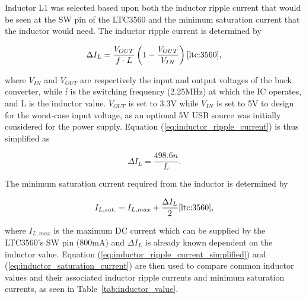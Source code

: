 Inductor L1 was selected based upon both the inductor ripple current that would be seen at the SW pin of the LTC3560 and the minimum saturation current that the inductor would need. The inductor ripple current is determined by

\begin{equation}
\label{eq:inductor_ripple_current}
    {\Delta}I_{L} = \frac{V_{OUT}}{f\cdot L}\left(1-\frac{V_{OUT}}{V_{IN}}\right) \cite{ltc:3560},
\end{equation}

where $V_{IN}$ and $V_{OUT}$ are respectively the input and output voltages of the buck converter, while f is the switching frequency (2.25MHz) at which the IC operates, and L is the inductor value. $V_{OUT}$ is set to 3.3V while $V_{IN}$ is set to 5V to design for the worst-case input voltage, as an optional 5V USB source was initially considered for the power supply. Equation (\ref{eq:inductor_ripple_current}) is thus simplified as

\begin{equation}
\label{eq:inductor_ripple_current_simplified}
    {\Delta}I_{L} = \frac{498.6n}{L}.
\end{equation}

The minimum saturation current required from the inductor is determined by

\begin{equation}
\label{eq:inductor_saturation_current}
    I_{L,sat.} = I_{L,max} + \frac{{\Delta}I_{L}}{2} \cite{ltc:3560},
\end{equation}

where $I_{L,max}$ is the maximum DC current which can be supplied by the LTC3560's SW pin (800mA) and ${\Delta}I_{L}$ is already known dependent on the inductor value. Equation (\ref{eq:inductor_ripple_current_simplified}) and (\ref{eq:inductor_saturation_current}) are then used to compare common inductor values and their associated inductor ripple currents and minimum saturation currents, as seen in Table~\ref{tab:inductor_value}.


